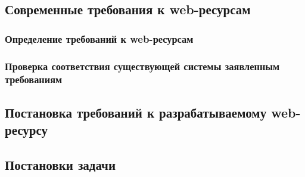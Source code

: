 \subsection{Современные требования к web-ресурсам}
    \subsubsection{Определение требований к web-ресурсам}
    \subsubsection{Проверка соответствия существующей системы заявленным требованиям}

\subsection{Постановка требований к разрабатываемому web-ресурсу}
\subsection{Постановки задачи}

\clearpage
